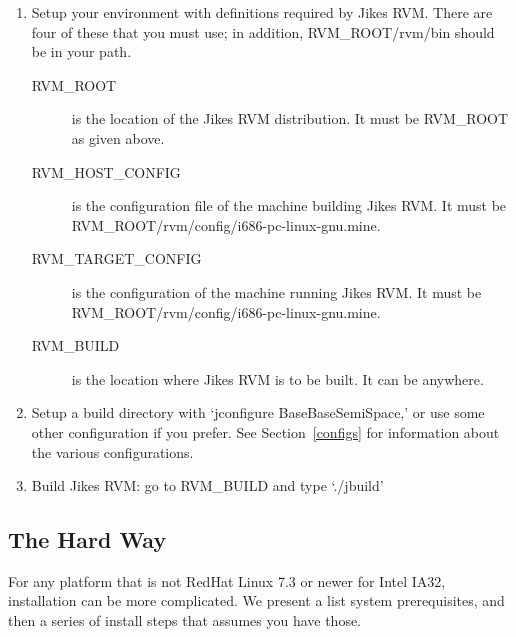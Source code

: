\begin{enumerate}
\item Setup your environment with definitions required by Jikes RVM.
There are four of these that you must use; in addition,
RVM\_ROOT/rvm/bin should be in your path.
\begin{description}

\item[RVM\_ROOT] is the location of the Jikes RVM distribution.  It
must be RVM\_ROOT as given above.

\item[RVM\_HOST\_CONFIG] is the configuration file of the machine
building Jikes RVM.  It must be
RVM\_ROOT/rvm/config/i686-pc-linux-gnu.mine.

\item[RVM\_TARGET\_CONFIG] is the configuration of the machine running
Jikes RVM.  It must be RVM\_ROOT/rvm/config/i686-pc-linux-gnu.mine.

\item[RVM\_BUILD] is the location where Jikes RVM is to be built.  It
can be anywhere.
\end{description}

\item Setup a build directory with `jconfigure BaseBaseSemiSpace,' or
use some other configuration if you prefer. See Section~\ref{configs}
for information about the various configurations.

\item Build Jikes RVM: go to RVM\_BUILD and type `./jbuild'

\end{enumerate}

\newcommand{\gccURL}{ftp://ftp.gnu.org/gnu/gcc}
\newcommand{\glibcURL}{ftp://ftp.gnu.org/gnu/glibc}
\newcommand{\makeURL}{ftp://ftp.gnu.org/gnu/make}
\newcommand{\tarURL}{ftp://ftp.gnu.org/gnu/tar}
\newcommand{\autoconfURL}{ftp://ftp.gnu.org/gnu/autoconf}
\newcommand{\automakeURL}{ftp://ftp.gnu.org/gnu/automake}
\newcommand{\kshURL}{http://www.cs.mun.ca/~michael/pdksh}
\newcommand{\linuxPPCJDKURL}{http://www.ibm.com/java/jdk/linux/index.html}
\newcommand{\linuxKernelURL}{http://www.kernel.org}

\subsection{The Hard Way}

 For any platform that is not RedHat Linux 7.3 or newer for Intel
IA32, installation can be more complicated.  We present a list system
prerequisites, and then a series of install steps that assumes you
have those.

